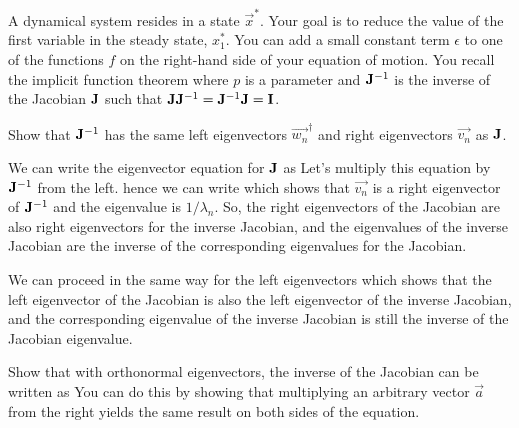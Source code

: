 A dynamical system resides in a state $\vec{x}^*$. Your goal is to reduce the value of the first variable in the steady state, $x_1^*$. You can add a small constant term $\epsilon$ to one of the functions $f$ on the right-hand side of your equation of motion. You recall the implicit function theorem 
where $p$ is a parameter and ${\bf J}^{-1}$ is the inverse of the Jacobian $\bf J$ such that ${\bf J}{\bf J}^{-1}={\bf J}^{-1}{\bf J}={\bf I}$. 
 
\subquestion 
Show that ${\bf J}^{-1}$ has the same left eigenvectors $\vec{w_n}^\dag$ and right eigenvectors $\vec{v_n}$ as $\bf J$. 

\solution 
We can write the eigenvector equation for $\bf J$ as 
Let's multiply this equation by ${\bf J}^{-1}$ from the left. 
hence we can write 
which shows that $\vec{v_n}$ is a right eigenvector of ${\bf J}^{-1}$ and the eigenvalue is $1/\lambda_n$. So, the right eigenvectors of the Jacobian are also right eigenvectors for the inverse Jacobian, and the eigenvalues of the inverse Jacobian are the inverse of the corresponding eigenvalues for the Jacobian. 

We can proceed in the same way for the left eigenvectors
which shows that the left eigenvector of the Jacobian is also the left eigenvector of the inverse Jacobian, and the corresponding eigenvalue of the 
inverse Jacobian is still the inverse of the Jacobian eigenvalue. 

\subquestion Show that with orthonormal eigenvectors, the inverse of the Jacobian can be written as 
You can do this by showing that multiplying an arbitrary vector $\vec{a}$ from the right yields the same result on both sides of the equation. 

